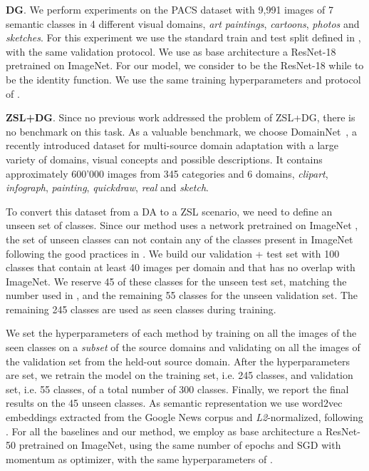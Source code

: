\documentclass[runningheads]{llncs}
\newcommand{\myparagraph}[1]{\noindent\textbf{#1}}
\begin{document}
\myparagraph{DG}. We perform experiments on the PACS dataset \cite{li2017deeper}with 9,991 images of 7 semantic classes in 4 different visual domains, \textit{art paintings}, \textit{cartoons}, \textit{photos} and \textit{sketches}. For this experiment we use the standard train and test split defined in \cite{li2017deeper}, with the same validation protocol. We use as base architecture a ResNet-18 \cite{he2016deep} pretrained on ImageNet. For our model, we consider  to be the ResNet-18 while  to be the identity function. We use the same training hyperparameters and protocol of \cite{li2019episodic}. 

\myparagraph{ZSL+DG}. Since no previous work addressed the problem of ZSL+DG, there is no benchmark on this task. As a valuable benchmark, we choose DomainNet~\cite{peng2019moment}, a recently introduced dataset for multi-source domain adaptation \cite{peng2019moment} with a large variety of domains, visual concepts and possible descriptions. It contains approximately 600'000 images from 345 categories and 6 domains,  \textit{clipart}, \textit{infograph}, \textit{painting}, \textit{quickdraw}, \textit{real} and \textit{sketch}. 

To convert this dataset from a DA to a ZSL scenario, we need to define an unseen set of classes. Since our method uses a network pretrained on ImageNet \cite{russakovsky2015imagenet}, the set of unseen classes can not contain any of the classes present in ImageNet following the good practices in \cite{xian2017zero}. We build our validation + test set with 100 classes that contain at least 40 images per domain and that has no overlap with ImageNet. We reserve 45 of these classes for the unseen test set, matching the number used in \cite{thong2019open}, and the remaining 55 classes for the unseen validation set. The remaining 245 classes are used as seen classes during training. 

We set the hyperparameters of each method by training on all the images of the seen classes on a \textit{subset} of the source domains and validating on all the images of the validation set from the held-out source domain. After the hyperparameters are set, we retrain the model on the training set, i.e. 245 classes, and validation set, i.e. 55 classes, of a total number of 300 classes. Finally, we report the final results on the 45 unseen classes. As semantic representation we use word2vec embeddings \cite{mikolov2013efficient} extracted from the Google News corpus and \textit{L2}-normalized, following \cite{thong2019open}.  For all the baselines and our method, we employ as base architecture a ResNet-50 \cite{he2016deep} pretrained on ImageNet, using the same number of epochs and SGD with momentum as optimizer, with the same hyperparameters of \cite{thong2019open}. 
\end{document}
